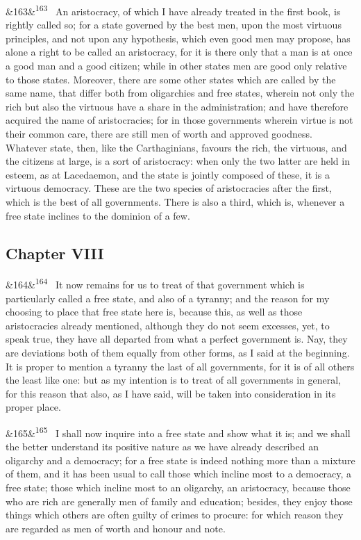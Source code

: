 \documentclass[12pt]{article}
\newcommand{\para}[1][]{\par\noindent\ifx&#1&\else\textsuperscript{\footnotesize #1}~\fi}
\begin{document}
\para[163] An aristocracy, of which I have already treated in the first book, is rightly called so; for a state governed by the best men, upon the most virtuous principles, and not upon any hypothesis, which even good men may propose, has alone a right to be called an aristocracy, for it is there only that a man is at once a good man and a good citizen; while in other states men are good only relative to those states. Moreover, there are some other states which are called by the same name, that differ both from oligarchies and free states, wherein not only the rich but also the virtuous have a share in the administration; and have therefore acquired the name of aristocracies; for in those governments wherein virtue is not their common care, there are still men of worth and approved goodness. Whatever state, then, like the Carthaginians, favours the rich, the virtuous, and the citizens at large, is a sort of aristocracy: when only the two latter are held in esteem, as at Lacedaemon, and the state is jointly composed of these, it is a virtuous democracy. These are the two species of aristocracies after the first, which is the best of all governments. There is also a third, which is, whenever a free state inclines to the dominion of a few.

\subsection*{Chapter VIII}

\para[164] It now remains for us to treat of that government which is particularly called a free state, and also of a tyranny; and the reason for my choosing to place that free state here is, because this, as well as those aristocracies already mentioned, although they do not seem excesses, yet, to speak true, they have all departed from what a perfect government is. Nay, they are deviations both of them equally from other forms, as I said at the beginning. It is proper to mention a tyranny the last of all governments, for it is of all others the least like one: but as my intention is to treat of all governments in general, for this reason that also, as I have said, will be taken into consideration in its proper place.

\para[165] I shall now inquire into a free state and show what it is; and we shall the better understand its positive nature as we have already described an oligarchy and a democracy; for a free state is indeed nothing more than a mixture of them, and it has been usual to call those which incline most to a democracy, a free state; those which incline most to an oligarchy, an aristocracy, because those who are rich are generally men of family and education; besides, they enjoy those things which others are often guilty of crimes to procure: for which reason they are regarded as men of worth and honour and note.
\end{document}
